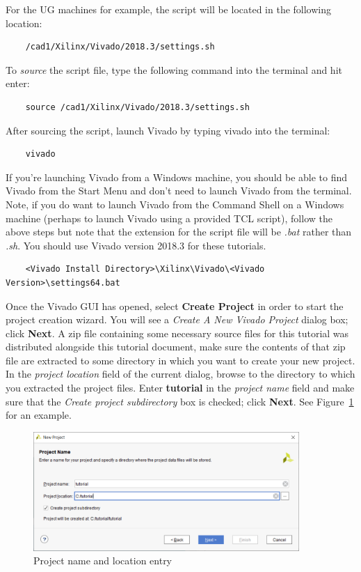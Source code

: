 \documentclass[11pt]{article}
\begin{document}
\noindent
For the UG machines for example, the script will be located in the following location:

\begin{verbatim}
    /cad1/Xilinx/Vivado/2018.3/settings.sh
\end{verbatim}

\noindent
To \textit{source} the script file, type the following command into the terminal and hit enter:

\begin{verbatim}
    source /cad1/Xilinx/Vivado/2018.3/settings.sh
\end{verbatim}

\noindent
After sourcing the script, launch Vivado by typing vivado into the terminal:

\begin{verbatim}
    vivado
\end{verbatim}

\noindent
If you're launching Vivado from a Windows machine, you should be able to find Vivado from the Start Menu and don't need to launch Vivado from the terminal. Note, if you do want to launch Vivado from the Command Shell on a Windows machine (perhaps to launch Vivado using a provided TCL script), follow the above steps but note that the extension for the script file will be \textit{.bat} rather than \textit{.sh}. You should use Vivado version 2018.3 for these tutorials.

\begin{verbatim}
    <Vivado Install Directory>\Xilinx\Vivado\<Vivado Version>\settings64.bat
\end{verbatim}

\noindent
Once the Vivado GUI has opened, select \textbf{Create Project} in order to start the project creation wizard. You will see a \textit{Create A New Vivado Project} dialog box; click \textbf{Next}. A zip file containing some necessary source files for this tutorial was distributed alongside this tutorial document, make sure the contents of that zip file are extracted to some directory in which you want to create your new project. In the \textit{project location} field of the current dialog, browse to the directory to which you extracted the project files. Enter \textbf{tutorial} in the \textit{project name} field and make sure that the \textit{Create project subdirectory} box is checked; click \textbf{Next}. See Figure~\ref{fig:new_proj_name} for an example.

\begin{figure}[!h]
    \centering
    \includegraphics[width=0.9\textwidth]{images/new_proj_name.png}
    \caption{Project name and location entry}
    \label{fig:new_proj_name}
\end{figure}
\end{document}
